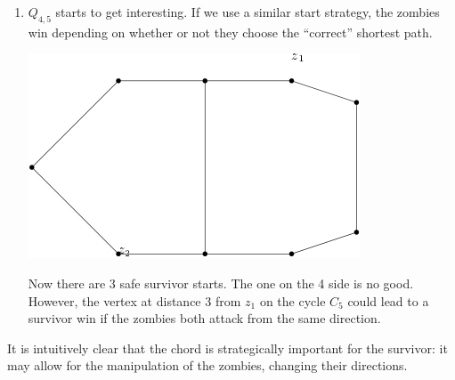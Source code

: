 \documentclass[letterpaper, 10pt]{article}
\begin{document}
\begin{enumerate}
\item $Q_{4,5}$ starts to get interesting. If we use a similar start strategy, the zombies
win depending on whether or not they choose the ``correct'' shortest path.

\begin{center}
  \includegraphics[scale=0.35]{Q_4,5}
\end{center}

Now there are 3 safe survivor starts. The one on the 4 side is no good.
However, the vertex at distance 3 from $z_1$ on the cycle $C_5$ could lead
to a survivor win if the zombies both attack from the same direction.

\end{enumerate}

It is intuitively clear that the chord is strategically important for the survivor:
it may allow for the manipulation of the zombies, changing their directions.

%
%
\end{document}
